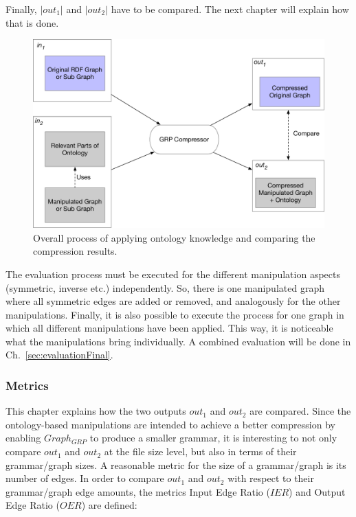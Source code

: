 Finally, $|out_1|$ and $|out_2|$ have to be compared. The next chapter will explain how that is done.

\begin{figure}
	\centering
	\includegraphics[width=0.9\linewidth]{figures/4_implementation/overallProcess}
	\caption{Overall process of applying ontology knowledge and comparing the compression results.}
	\label{fig:overallprocess}
\end{figure}

The evaluation process must be executed for the different manipulation aspects (symmetric, inverse etc.) independently. So, there is one manipulated graph where all symmetric edges are added or removed, and analogously for the other manipulations. Finally, it is also possible to execute the process for one graph in which all different manipulations have been applied. This way, it is noticeable what the manipulations bring individually. A combined evaluation will be done in Ch.~\ref{sec:evaluationFinal}.

\subsubsection{Metrics}

This chapter explains how the two outputs $out_1$ and $out_2$ are compared. Since the ontology-based manipulations are intended to achieve a better compression by enabling $Graph_{GRP}$ to produce a smaller grammar, it is interesting to not only compare $out_1$ and $out_2$ at the file size level, but also in terms of their grammar/graph sizes. A reasonable metric for the size of a grammar/graph is its number of edges. In order to compare $out_1$ and $out_2$ with respect to their grammar/graph edge amounts, the metrics Input Edge Ratio ($IER$) and Output Edge Ratio ($OER$)  are defined: 

